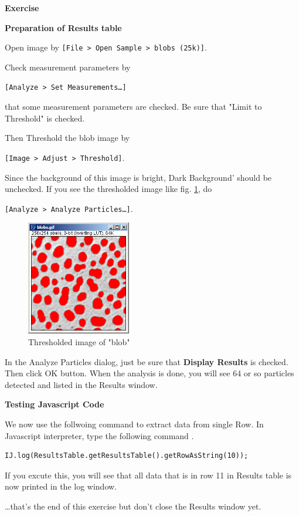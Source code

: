 \documentclass[11pt,a4paper,oneside]{report}
\newenvironment{indentexercise}[1]%
{{\setlength{\leftmargin}{2em}}%
\textbf{Exercise \thesubsection-#1}%
\begin{list}{}%
	\item%
}
{\end{list}}
\newcommand{\ijmenu}[1]{\texttt{\small#1}}
\begin{document}
\begin{indentexercise}{1}

\textbf{Preparation of Results table}

Open image by \ijmenu{[File > Open Sample > blobs (25k)]}. 

Check measurement parameters by 

\ijmenu{[Analyze > Set Measurements\dots]}

that some measurement parameters are checked. Be sure that "Limit to Threshold" is checked. 

Then Threshold the blob image by 

\ijmenu{[Image > Adjust > Threshold]}. 

Since the background of this image is bright, Dark Background' should be unchecked. If you see the thresholded image like fig. \ref{fig:ThresBlob},  do 

\ijmenu{[Analyze > Analyze Particles\dots]}. 

\begin{figure}[htbp]
\begin{center}
\includegraphics[height=50mm]{fig2/ThrehsoldedBlob.png}
\caption{Thresholded image of "blob"}
\label{fig:ThresBlob}
\end{center}
\end{figure} 

In the Analyze Particles dialog, just be sure that \textbf{Display Results} is checked. Then click OK button. When the analysis is done, you will see  64 or so particles detected and listed in the Results window. 

\textbf{Testing Javascript Code}

We now use the follwoing command to extract data from single Row. In Javascript interpreter, type the following command . 

\begin{lstlisting}[numbers=none]
IJ.log(ResultsTable.getResultsTable().getRowAsString(10));
\end{lstlisting}

If you excute this, you will see that all data that is in row 11 in Results table is now printed in the log window. 

\dots that's the end of this exercise but don't close the Results window yet.   
\end{indentexercise}
\end{document}
